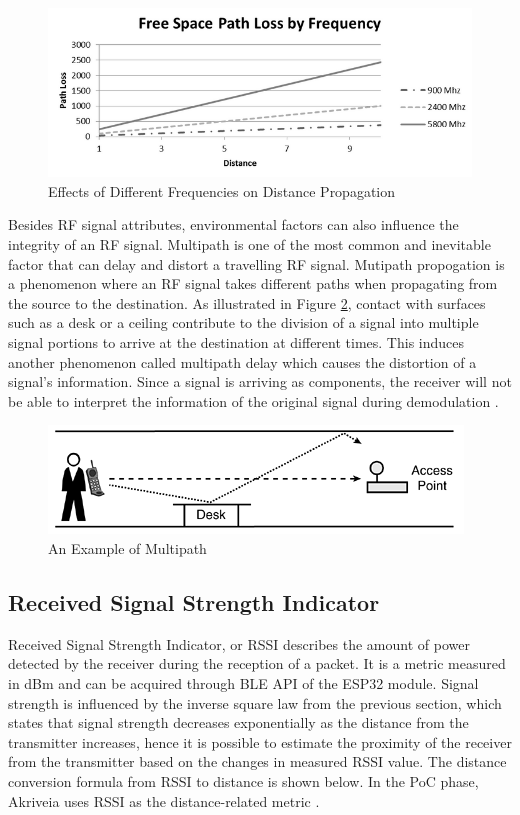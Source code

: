 \medskip
\begin{figure}[H]
\centering
    \includegraphics[width=\linewidth]{./images/FSP.png}
    \caption{Effects of Different Frequencies on Distance Propagation}
    \label{fsp}
\end{figure}

\medskip
Besides RF signal attributes, environmental factors can also influence the integrity of an RF signal. Multipath is one of the most common and inevitable factor that can delay and distort a travelling RF signal. Mutipath propogation is a phenomenon where an RF signal takes different paths when propagating from the source to the destination. As illustrated in Figure \ref{multipath}, contact with surfaces such as a desk or a ceiling contribute to the division of a signal into multiple signal portions to arrive at the destination at different times. This induces another phenomenon called multipath delay which causes the distortion of a signal's information. Since a signal is arriving as components, the receiver will not be able to interpret the information of the original signal during demodulation \cite{R2-4-1}.

\medskip
\begin{figure}[H]
\centering
    \includegraphics[width=\linewidth]{./images/multipath.png}
    \caption{An Example of Multipath}
    \label{multipath}
\end{figure}

\pagebreak
\subsection{Received Signal Strength Indicator}
\medskip
Received Signal Strength Indicator, or RSSI describes the amount of power detected by the receiver during the reception of a packet. It is a metric measured in dBm and can be acquired through BLE API of the ESP32 module. Signal strength is influenced by the inverse square law from the previous section, which states that signal strength decreases exponentially as the distance from the transmitter increases, hence it is possible to estimate the proximity of the receiver from the transmitter based on the changes in measured RSSI value. The distance conversion formula from RSSI to distance is shown below. In the PoC phase, Akriveia uses RSSI as the distance-related metric \cite{R2-5-1}.

